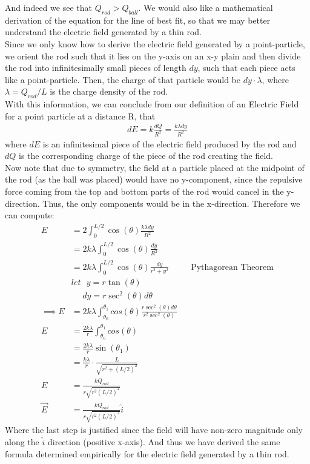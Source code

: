 \documentclass[oneside,12pt]{amsart}
\begin{document}
	\indent And indeed we see that $Q_{rod}>Q_{ball}$. We would also like a mathematical derivation of the equation for the line of best fit, so that we may better understand the electric field generated by a thin rod.\\
	
	\indent Since we only know how to derive the electric field generated by a point-particle, we orient the rod such that it lies on the y-axis on an x-y plain and then divide the rod into infinitesimally small pieces of length $dy$, such that each piece acts like a point-particle. Then, the charge of that particle would be $dy\cdot \lambda$, where $\lambda = Q_{rod}/L$ is the charge density of the rod.\\
	
	\indent With this information, we can conclude from our definition of an Electric Field for a point particle at a distance R, that 
	\begin{align*}
	 dE = k\frac{dQ}{R^2} = \frac{k\lambda dy}{R^2}
	\end{align*}
	where $dE$ is an infinitesimal piece of the electric field produced by the rod and $dQ$ is the corresponding charge of the piece of the rod creating the field.\\
	
	\indent Now note that due to symmetry, the field at a particle placed at the midpoint of the rod (as the ball was placed) would have no y-component, since the repulsive force coming from the top and bottom parts of the rod would cancel in the y-direction. Thus, the only components would be in the x-direction. Therefore we can compute:
	\begin{align*}
	E &= 2\int_0^{L/2}\cos(\theta)\frac{k\lambda dy}{R^2}\\
	&=2k\lambda \int_0^{L/2} \cos(\theta)\frac{dy}{R^2}\\
	&=2k\lambda \int_0^{L/2} \cos(\theta)\frac{dy}{r^2+y^2} &&\text{Pythagorean Theorem}\\
	&let\:\:\:y=r\tan(\theta)\\
	&\:\:\: \:\:\:dy = r\sec^2(\theta)d\theta\\
	\implies E&=2k\lambda \int_{\theta_0}^{\theta_1} cos(\theta) \frac{r\sec^2(\theta)d\theta}{r^2\sec^2(\theta)}\\
	E&=\frac{2k\lambda}{r} \int_{\theta_0}^{\theta_1} cos(\theta) \\
	&=\frac{2k\lambda}{r}\sin(\theta_1)\\
	&=\frac{k\lambda}{r}\cdot\frac{L}{\sqrt{r^2+(L/2)^2}}\\
	E&= \frac{kQ_{rod}}{r\sqrt{r^2(L/2)^2}}\\
	\vec{E} &=  \frac{kQ_{rod}}{r\sqrt{r^2(L/2)^2}}\hat{i}
	\end{align*}
	Where the last step is justified since the field will have non-zero magnitude only along the $\hat{i}$ direction (positive x-axis).
	And thus we have derived the same formula determined empirically for the electric field generated by a thin rod.
	
\end{document}
